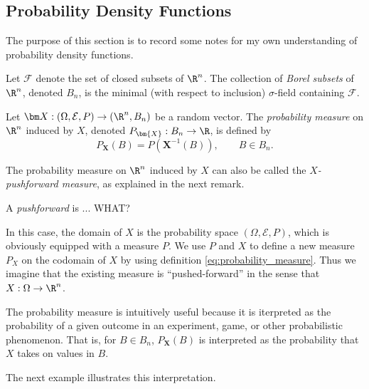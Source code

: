 \subsection{Probability Density Functions}
The purpose of this section is to record some notes for my own understanding of probability density functions.

\begin{defn}
Let $\mathcal{F}$ denote the set of closed subsets of $\R^n$. The collection of \textit{Borel subsets} of $\R^n$, denoted $B_n$, is the minimal (with respect to inclusion) $\sigma$-field containing $\mathcal{F}$.
\end{defn}



\begin{defn}
Let $\bm X : (\Omega, \mathcal E, P) \to (\R^n, B_n)$ be a random vector. The \textit{probability measure} on $\R^n$ induced by $X$, denoted $P_\bm{X} : B_n \to \R$, is defined by
%
\begin{equation}
    \label{eq:probability_measure}
    P_\bm{X}(B) = P ( \bm X^{-1} (B)), \qquad B \in B_n.
\end{equation}
\end{defn}

The probability measure on $\R^n$ induced by $X$ can also be called the \textit{$X$-pushforward measure}, as explained in the next remark. 

\begin{remark}
A \textit{pushforward} is ... WHAT? 

In this case, the domain of $X$ is the probability space $(\Omega, \mathcal E, P)$, which is obviously equipped with a measure $P$. We use $P$ and $X$ to define a new measure $P_X$ on the codomain of $X$ by using definition \eqref{eq:probability_measure}. Thus we imagine that the existing measure is ``pushed-forward'' in the sense that $X: \Omega \to \R^n$. 
\end{remark}

The probability measure is intuitively useful because it is iterpreted as the probability of a given outcome in an experiment, game, or other probabilistic phenomenon. That is, for $B \in B_n$, $P_\bm{X}(B)$ is interpreted as the probability that $X$ takes on values in $B$. 

The next example illustrates this interpretation.

